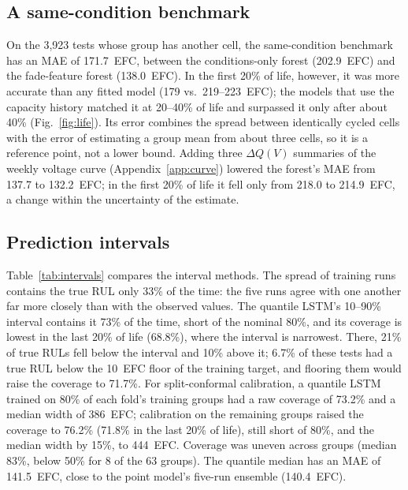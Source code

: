 \documentclass[conference]{IEEEtran}
\begin{document}
\subsection{A same-condition benchmark}
\label{sec:sources}
On the 3,923 tests whose group has another cell, the same-condition benchmark has an MAE of 171.7~EFC, between the conditions-only forest (202.9~EFC) and the fade-feature forest (138.0~EFC). In the first 20\% of life, however, it was more accurate than any fitted model (179 vs.\ 219--223~EFC); the models that use the capacity history matched it at 20--40\% of life and surpassed it only after about 40\% (Fig.~\ref{fig:life}). Its error combines the spread between identically cycled cells with the error of estimating a group mean from about three cells, so it is a reference point, not a lower bound. Adding three $\Delta Q(V)$ summaries of the weekly voltage curve (Appendix~\ref{app:curve}) lowered the forest's MAE from 137.7 to 132.2~EFC; in the first 20\% of life it fell only from 218.0 to 214.9~EFC, a change within the uncertainty of the estimate.

\subsection{Prediction intervals}
\label{sec:resintervals}
Table~\ref{tab:intervals} compares the interval methods. The spread of training runs contains the true RUL only 33\% of the time: the five runs agree with one another far more closely than with the observed values. The quantile LSTM's 10--90\% interval contains it 73\% of the time, short of the nominal 80\%, and its coverage is lowest in the last 20\% of life (68.8\%), where the interval is narrowest. There, 21\% of true RULs fell below the interval and 10\% above it; 6.7\% of these tests had a true RUL below the 10~EFC floor of the training target, and flooring them would raise the coverage to 71.7\%. For split-conformal calibration, a quantile LSTM trained on 80\% of each fold's training groups had a raw coverage of 73.2\% and a median width of 386~EFC; calibration on the remaining groups raised the coverage to 76.2\% (71.8\% in the last 20\% of life), still short of 80\%, and the median width by 15\%, to 444~EFC. Coverage was uneven across groups (median 83\%, below 50\% for 8 of the 63 groups). The quantile median has an MAE of 141.5~EFC, close to the point model's five-run ensemble (140.4~EFC).
\end{document}
